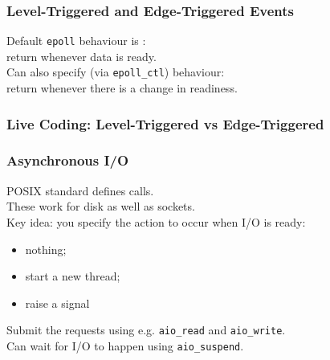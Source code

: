 \documentclass[aspectratio=43]{beamer}
\newenvironment{changemargin}[1]{%
  \begin{list}{}{%
    \setlength{\topsep}{0pt}%
    \setlength{\leftmargin}{#1}%
    \setlength{\rightmargin}{1em}
    \setlength{\listparindent}{\parindent}%
    \setlength{\itemindent}{\parindent}%
    \setlength{\parsep}{\parskip}%
  }%
  \item[]}{\end{list}}
\begin{document}
\begin{frame}
  \frametitle{Level-Triggered and Edge-Triggered Events}
  \begin{changemargin}{2em}
    Default {\tt epoll} behaviour is :\\
    \quad return whenever data is ready.\\[1em]

    Can also specify (via {\tt epoll\_ctl})  behaviour:\\
    \quad return whenever there is a change in readiness.\\[1em]
  \end{changemargin}
\end{frame}

\begin{frame}
  \frametitle{Live Coding: Level-Triggered vs Edge-Triggered}
\end{frame}

\begin{frame}
  \frametitle{Asynchronous I/O}
  \begin{changemargin}{2em}
    POSIX standard defines  calls.\\[1em]

    These work for disk as well as sockets.\\[1em]

    Key idea: you specify the action to occur when I/O is ready:
    \begin{itemize}
      \item nothing;
      \item start a new thread;
      \item raise a signal
    \end{itemize}

    Submit the requests using e.g. {\tt aio\_read} and {\tt aio\_write}.\\[1em]
    Can wait for I/O to happen using {\tt aio\_suspend}.
  \end{changemargin}
\end{frame}
\end{document}
